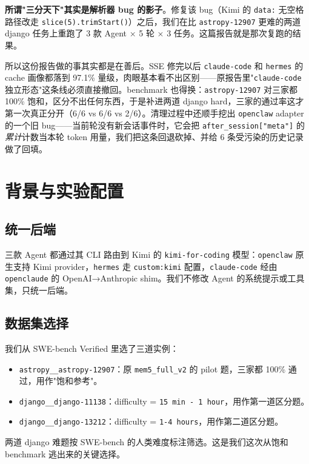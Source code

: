 \documentclass[11pt,a4paper]{article}
\begin{document}
\textbf{所谓"三分天下"其实是解析器 bug 的影子}。修复该 bug（Kimi 的 \texttt{data:} 无空格路径改走 \texttt{slice(5).trimStart()}）之后，我们在比 \texttt{astropy-12907} 更难的两道 django 任务上重跑了 3 款 Agent × 5 轮 × 3 任务。这篇报告就是那次复跑的结果。

所以这份报告做的事其实都是在善后。SSE 修完以后 \texttt{claude-code} 和 \texttt{hermes} 的 cache 画像都落到 97.1\% 量级，肉眼基本看不出区别——原报告里"\texttt{claude-code} 独立形态"这条线必须直接撤回。benchmark 也得换：\texttt{astropy-12907} 对三家都 100\% 饱和，区分不出任何东西，于是补进两道 django hard，三家的通过率这才第一次真正分开（6/6 vs 6/6 vs 2/6）。清理过程中还顺手挖出 \texttt{openclaw} adapter 的一个旧 bug——当前轮没有新会话事件时，它会把 \texttt{after\_session["meta"]} 的\emph{累计}计数当本轮 token 用量，我们把这条回退砍掉、并给 6 条受污染的历史记录做了回填。

\section{背景与实验配置}

\subsection{统一后端}
三款 Agent 都通过其 CLI 路由到 Kimi 的 \texttt{kimi-for-coding} 模型：\texttt{openclaw} 原生支持 Kimi provider，\texttt{hermes} 走 \texttt{custom:kimi} 配置，\texttt{claude-code} 经由 \texttt{openclaude} 的 OpenAI→Anthropic shim。我们不修改 Agent 的系统提示或工具集，只统一后端。

\subsection{数据集选择}
我们从 SWE-bench Verified 里选了三道实例：
\begin{itemize}
  \item \texttt{astropy\_\_astropy-12907}：原 \texttt{mem5\_full\_v2} 的 pilot 题，三家都 100\% 通过，用作"饱和参考"。
  \item \texttt{django\_\_django-11138}：difficulty = \texttt{15 min - 1 hour}，用作第一道区分题。
  \item \texttt{django\_\_django-13212}：difficulty = \texttt{1-4 hours}，用作第二道区分题。
\end{itemize}

两道 django 难题按 SWE-bench 的人类难度标注筛选。这是我们这次从饱和 benchmark 逃出来的关键选择。
\end{document}
